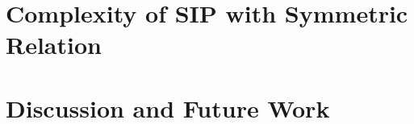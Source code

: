 

\section{Complexity of SIP with Symmetric Relation} \label{sec:SIP:symmetric}


\section{Discussion and Future Work} \label{sec:SIP:discussion}






